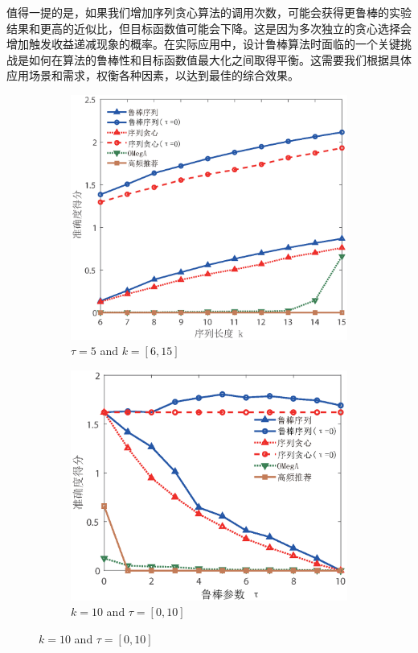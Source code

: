 值得一提的是，如果我们增加序列贪心算法的调用次数，可能会获得更鲁棒的实验结果和更高的近似比，但目标函数值可能会下降。这是因为多次独立的贪心选择会增加触发收益递减现象的概率。在实际应用中，设计鲁棒算法时面临的一个关键挑战是如何在算法的鲁棒性和目标函数值最大化之间取得平衡。这需要我们根据具体应用场景和需求，权衡各种因素，以达到最佳的综合效果。

\begin{figure}[H]
    \centering
    \begin{subfigure}{0.45\textwidth}
        \includegraphics[width=\linewidth]{figure/rosenets/wik/wik-acc}
        \caption{$\tau=5$ and $k=[6,15]$}
        \label{fig:wik-acc}
    \end{subfigure}
    \hfill
    \begin{subfigure}{0.45\textwidth}
        \includegraphics[width=\linewidth]{figure/rosenets/wik/wik-acc-t}
        \caption{$k=10$ and $\tau=[0,10]$}
        \label{fig:wik-acc-t}
    \end{subfigure}


\end{figure}
